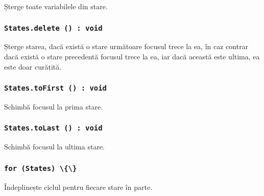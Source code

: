 Șterge toate variabilele din stare.

\subsubsection{\lstinline|States.delete () : void|}

Șterge starea, dacă există o stare următoare focusul trece la ea, în caz contrar dacă există o stare precedentă focusul trece la ea, iar dacă această este ultima, ea este doar curățită.

\subsubsection{\lstinline|States.toFirst () : void|}

Schimbă focusul la prima stare.

\subsubsection{\lstinline|States.toLast () : void|}

Schimbă focusul la ultima stare.

\subsubsection{\lstinline|for (States) \{\}|}

Îndeplinește ciclul pentru fiecare stare în parte.

